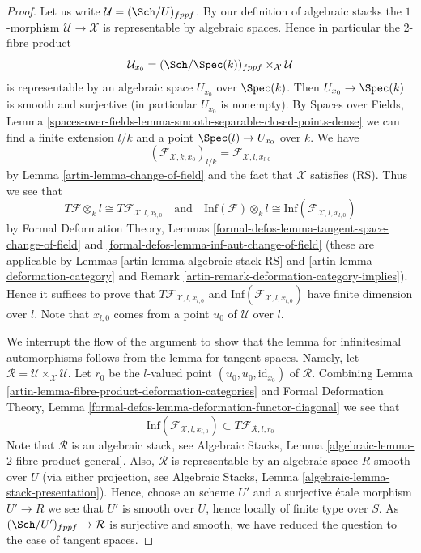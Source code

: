 \begin{proof}

Let us write $\mathcal{U} = (\Sch/U)_{fppf}$. By our definition
of algebraic stacks the $1$-morphism $\mathcal{U} \to \mathcal{X}$
is representable by algebraic spaces. Hence in particular the
2-fibre product
$$
\mathcal{U}_{x_0} = (\Sch/\Spec(k))_{fppf} \times_\mathcal{X} \mathcal{U}
$$
is representable by an algebraic space $U_{x_0}$ over $\Spec(k)$. Then
$U_{x_0} \to \Spec(k)$ is smooth and surjective (in particular $U_{x_0}$
is nonempty). By Spaces over Fields, Lemma
\ref{spaces-over-fields-lemma-smooth-separable-closed-points-dense}
we can find a finite extension $l/k$ and a point
$\Spec(l) \to U_{x_0}$ over $k$. We have
$$
(\mathcal{F}_{\mathcal{X}, k , x_0})_{l/k} =
\mathcal{F}_{\mathcal{X}, l, x_{l, 0}}
$$
by Lemma \ref{artin-lemma-change-of-field} and the fact that $\mathcal{X}$
satisfies (RS). Thus we see that
$$
T\mathcal{F} \otimes_k l \cong T\mathcal{F}_{\mathcal{X}, l, x_{l, 0}}
\quad\text{and}\quad
\text{Inf}(\mathcal{F}) \otimes_k l \cong
\text{Inf}(\mathcal{F}_{\mathcal{X}, l, x_{l, 0}})
$$
by
Formal Deformation Theory, Lemmas
\ref{formal-defos-lemma-tangent-space-change-of-field} and
\ref{formal-defos-lemma-inf-aut-change-of-field}
(these are applicable by
Lemmas \ref{artin-lemma-algebraic-stack-RS} and
\ref{artin-lemma-deformation-category} and
Remark \ref{artin-remark-deformation-category-implies}).
Hence it suffices to prove that $T\mathcal{F}_{\mathcal{X}, l, x_{l, 0}}$
and $\text{Inf}(\mathcal{F}_{\mathcal{X}, l, x_{l, 0}})$
have finite dimension over $l$. Note that $x_{l, 0}$ comes from a point
$u_0$ of $\mathcal{U}$ over $l$.

\medskip\noindent
We interrupt the flow of the argument to show that the lemma for
infinitesimal automorphisms follows from the lemma for tangent spaces.
Namely, let
$\mathcal{R} = \mathcal{U} \times_\mathcal{X} \mathcal{U}$.
Let $r_0$ be the $l$-valued point $(u_0, u_0, \text{id}_{x_0})$ of
$\mathcal{R}$. Combining
Lemma \ref{artin-lemma-fibre-product-deformation-categories} and
Formal Deformation Theory, Lemma
\ref{formal-defos-lemma-deformation-functor-diagonal}
we see that
$$
\text{Inf}(\mathcal{F}_{\mathcal{X}, l, x_{l, 0}})
\subset
T\mathcal{F}_{\mathcal{R}, l, r_0}
$$
Note that $\mathcal{R}$ is an algebraic stack, see
Algebraic Stacks, Lemma \ref{algebraic-lemma-2-fibre-product-general}.
Also, $\mathcal{R}$ is representable by an algebraic space $R$
smooth over $U$ (via either projection, see
Algebraic Stacks, Lemma \ref{algebraic-lemma-stack-presentation}).
Hence, choose an scheme $U'$ and a surjective \'etale morphism
$U' \to R$ we see that $U'$ is smooth over $U$, hence locally of
finite type over $S$. As $(\Sch/U')_{fppf} \to \mathcal{R}$ is
surjective and smooth, we have reduced the question to the case
of tangent spaces.


\end{proof}
